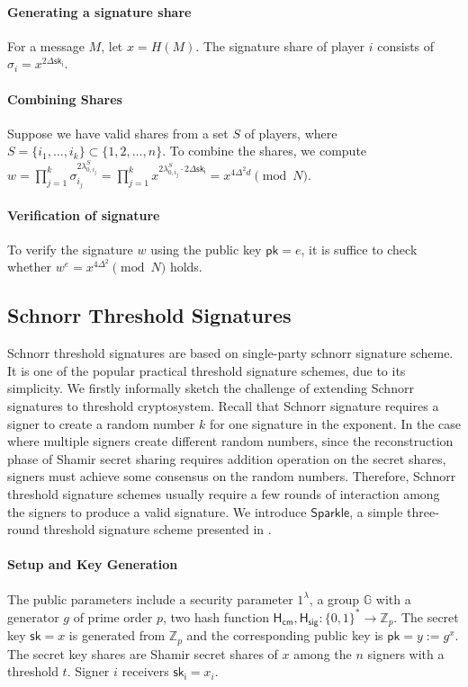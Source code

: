 \paragraph{Generating a signature share} For a message $M$, let $x=H(M)$. The signature share of player $i$ consists of $\sigma_i = x^{2 \Delta \mathsf{sk_i}}$. 

\paragraph{Combining Shares} Suppose we have valid shares from a set $S$ of players, where $S=\{i_1, \dots, i_k\}\subset \{1, 2, \dots, n\}$. To combine the shares, we compute $w=\prod_{j=1}^k \sigma_{i_j}^{2\lambda_{0, i_j}^S} = \prod_{j=1}^k x^{2\lambda_{0, i_j}^S \cdot 2\Delta \mathsf{sk_i}} =x^{4\Delta^2 d}\pmod {N}$. 

\paragraph{Verification of signature} To verify the signature $w$ using the public key $\mathsf{pk}=e$, it is suffice to check whether $w^e=x^{4\Delta^2}\pmod{N}$ holds. 


\subsection{Schnorr Threshold Signatures}
Schnorr threshold signatures are based on single-party schnorr signature scheme. It is one of the popular practical threshold signature schemes, due to its simplicity. We firstly informally sketch the challenge of extending Schnorr signatures to threshold cryptosystem. Recall that Schnorr signature requires a signer to create a random number $k$ for one signature in the exponent. In the case where multiple signers create different random numbers, since the reconstruction phase of Shamir secret sharing requires addition operation on the secret shares, signers must achieve some consensus on the random numbers. Therefore, Schnorr threshold signature schemes usually require a few rounds of interaction among the signers to produce a valid signature. We introduce $\mathsf{Sparkle}$, a simple three-round threshold signature scheme presented in \cite{DBLP:conf/crypto/CritesKM23}.

\paragraph{Setup and Key Generation} The public parameters include a security parameter $1^\lambda$, a group $\mathbb{G}$ with a generator $g$ of prime order $p$, two hash function $\mathsf{H_{cm}}, \mathsf{H_{sig}}: \{0,1\}^\ast \to \mathbb{Z}_p$. The secret key $\mathsf{sk}=x$ is generated from $\mathbb{Z}_p$ and the corresponding public key is $\mathsf{pk}=y:=g^x$. The secret key shares are Shamir secret shares of $x$ among the $n$ signers with a threshold $t$. Signer $i$ receivers $\mathsf{sk_i}=x_i$. 


